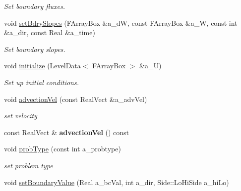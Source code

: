 \begin{DoxyCompactItemize}
\begin{DoxyCompactList}\small\item\em Set boundary fluxes. \end{DoxyCompactList}\item 
void \hyperlink{class_advect_scalar_i_b_c_a92bb0b6e428e22db95bafa3108822c6b}{set\-Bdry\-Slopes} (F\-Array\-Box \&a\-\_\-d\-W, const F\-Array\-Box \&a\-\_\-\-W, const int \&a\-\_\-dir, const Real \&a\-\_\-time)
\begin{DoxyCompactList}\small\item\em Set boundary slopes. \end{DoxyCompactList}\item 
void \hyperlink{class_advect_scalar_i_b_c_aa639a57bf61e2ccf234709a4a8c42f8c}{initialize} (Level\-Data$<$ F\-Array\-Box $>$ \&a\-\_\-\-U)
\begin{DoxyCompactList}\small\item\em Set up initial conditions. \end{DoxyCompactList}\item 
\hypertarget{class_advect_scalar_i_b_c_a97a90269455554cd1888afdecd919a08}{void \hyperlink{class_advect_scalar_i_b_c_a97a90269455554cd1888afdecd919a08}{advection\-Vel} (const Real\-Vect \&a\-\_\-adv\-Vel)}\label{class_advect_scalar_i_b_c_a97a90269455554cd1888afdecd919a08}

\begin{DoxyCompactList}\small\item\em set velocity \end{DoxyCompactList}\item 
\hypertarget{class_advect_scalar_i_b_c_a70e85326184229082b486278904e62d3}{const Real\-Vect \& {\bfseries advection\-Vel} () const }\label{class_advect_scalar_i_b_c_a70e85326184229082b486278904e62d3}

\item 
\hypertarget{class_advect_scalar_i_b_c_a256ba8ffcff98600194c9a70117c49e3}{void \hyperlink{class_advect_scalar_i_b_c_a256ba8ffcff98600194c9a70117c49e3}{prob\-Type} (const int a\-\_\-probtype)}\label{class_advect_scalar_i_b_c_a256ba8ffcff98600194c9a70117c49e3}

\begin{DoxyCompactList}\small\item\em set problem type \end{DoxyCompactList}\item 
\hypertarget{class_advect_scalar_i_b_c_a3e89d783c27ae02d503d23798f047524}{void \hyperlink{class_advect_scalar_i_b_c_a3e89d783c27ae02d503d23798f047524}{set\-Boundary\-Value} (Real a\-\_\-bc\-Val, int a\-\_\-dir, Side\-::\-Lo\-Hi\-Side a\-\_\-hi\-Lo)}\label{class_advect_scalar_i_b_c_a3e89d783c27ae02d503d23798f047524}


\end{DoxyCompactItemize}
